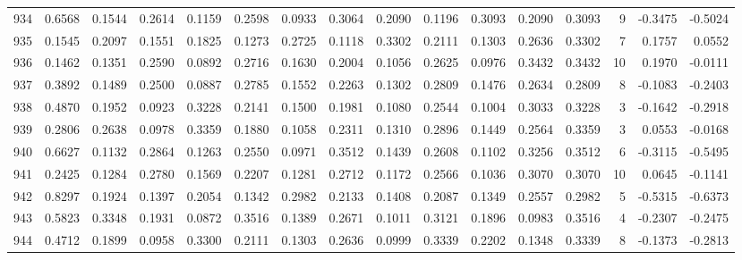 \begin{tabular}{lrrrrrrrrrrrrrrr}
934 &      0.6568 &  0.1544 &  0.2614 &  0.1159 &  0.2598 &  0.0933 &  0.3064 &  0.2090 &  0.1196 &  0.3093 &   0.2090 &     0.3093 &      9 &                   -0.3475 &                    -0.5024 \\
935 &      0.1545 &  0.2097 &  0.1551 &  0.1825 &  0.1273 &  0.2725 &  0.1118 &  0.3302 &  0.2111 &  0.1303 &   0.2636 &     0.3302 &      7 &                    0.1757 &                     0.0552 \\
936 &      0.1462 &  0.1351 &  0.2590 &  0.0892 &  0.2716 &  0.1630 &  0.2004 &  0.1056 &  0.2625 &  0.0976 &   0.3432 &     0.3432 &     10 &                    0.1970 &                    -0.0111 \\
937 &      0.3892 &  0.1489 &  0.2500 &  0.0887 &  0.2785 &  0.1552 &  0.2263 &  0.1302 &  0.2809 &  0.1476 &   0.2634 &     0.2809 &      8 &                   -0.1083 &                    -0.2403 \\
938 &      0.4870 &  0.1952 &  0.0923 &  0.3228 &  0.2141 &  0.1500 &  0.1981 &  0.1080 &  0.2544 &  0.1004 &   0.3033 &     0.3228 &      3 &                   -0.1642 &                    -0.2918 \\
939 &      0.2806 &  0.2638 &  0.0978 &  0.3359 &  0.1880 &  0.1058 &  0.2311 &  0.1310 &  0.2896 &  0.1449 &   0.2564 &     0.3359 &      3 &                    0.0553 &                    -0.0168 \\
940 &      0.6627 &  0.1132 &  0.2864 &  0.1263 &  0.2550 &  0.0971 &  0.3512 &  0.1439 &  0.2608 &  0.1102 &   0.3256 &     0.3512 &      6 &                   -0.3115 &                    -0.5495 \\
941 &      0.2425 &  0.1284 &  0.2780 &  0.1569 &  0.2207 &  0.1281 &  0.2712 &  0.1172 &  0.2566 &  0.1036 &   0.3070 &     0.3070 &     10 &                    0.0645 &                    -0.1141 \\
942 &      0.8297 &  0.1924 &  0.1397 &  0.2054 &  0.1342 &  0.2982 &  0.2133 &  0.1408 &  0.2087 &  0.1349 &   0.2557 &     0.2982 &      5 &                   -0.5315 &                    -0.6373 \\
943 &      0.5823 &  0.3348 &  0.1931 &  0.0872 &  0.3516 &  0.1389 &  0.2671 &  0.1011 &  0.3121 &  0.1896 &   0.0983 &     0.3516 &      4 &                   -0.2307 &                    -0.2475 \\
944 &      0.4712 &  0.1899 &  0.0958 &  0.3300 &  0.2111 &  0.1303 &  0.2636 &  0.0999 &  0.3339 &  0.2202 &   0.1348 &     0.3339 &      8 &                   -0.1373 &                    -0.2813 \\

\end{tabular}
